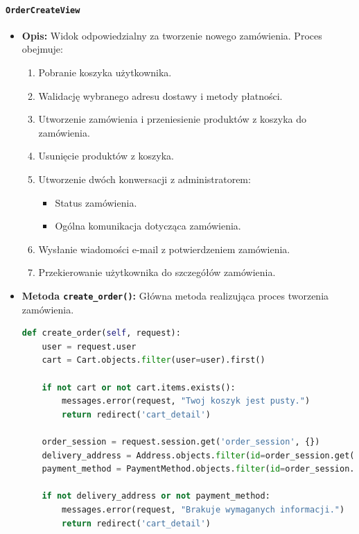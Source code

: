\documentclass[12pt,a4paper,oneside]{article}
\theoremstyle{definition}
\numberwithin{equation}{section}
\begin{document}
\paragraph{\texttt{OrderCreateView}}
\begin{itemize}
    \item \textbf{Opis:} Widok odpowiedzialny za tworzenie nowego zamówienia. Proces obejmuje:
    \begin{enumerate}
        \item Pobranie koszyka użytkownika.
        \item Walidację wybranego adresu dostawy i metody płatności.
        \item Utworzenie zamówienia i przeniesienie produktów z koszyka do zamówienia.
        \item Usunięcie produktów z koszyka.
        \item Utworzenie dwóch konwersacji z administratorem:
        \begin{itemize}
            \item Status zamówienia.
            \item Ogólna komunikacja dotycząca zamówienia.
        \end{itemize}
        \item Wysłanie wiadomości e-mail z potwierdzeniem zamówienia.
        \item Przekierowanie użytkownika do szczegółów zamówienia.
    \end{enumerate}
    \item \textbf{Metoda \texttt{create\_order()}:} Główna metoda realizująca proces tworzenia zamówienia.
    \begin{lstlisting}[language=Python, caption=Kod metody create_order]
def create_order(self, request):
    user = request.user
    cart = Cart.objects.filter(user=user).first()

    if not cart or not cart.items.exists():
        messages.error(request, "Twoj koszyk jest pusty.")
        return redirect('cart_detail')

    order_session = request.session.get('order_session', {})
    delivery_address = Address.objects.filter(id=order_session.get('selected_address_id'), user=user).first()
    payment_method = PaymentMethod.objects.filter(id=order_session.get('payment_method_id'), user=user).first()

    if not delivery_address or not payment_method:
        messages.error(request, "Brakuje wymaganych informacji.")
        return redirect('cart_detail')


\end{lstlisting}
\end{itemize}
\end{document}
